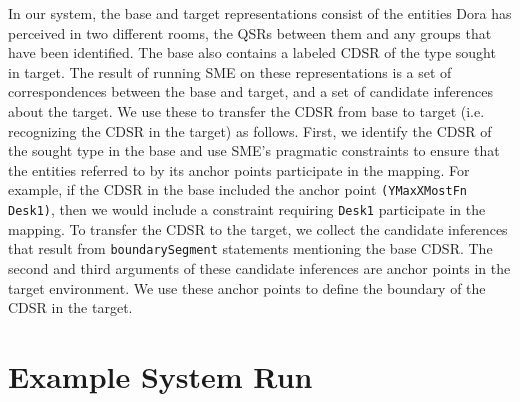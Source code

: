 \documentclass[letterpaper]{article}
\newcommand{\fw}[1]{\texttt{#1}}
\begin{document}

In our system, the base and target representations consist of the entities Dora has perceived in two different rooms, the QSRs between them and any groups that have been identified. The base also contains a labeled CDSR of the type sought in target. The result of running SME on these representations is a set of correspondences between the base and target, and a set of candidate inferences about the target. We use these to transfer the CDSR from base to target (i.e. recognizing the CDSR in the target) as follows. First, we identify the CDSR of the sought type in the base and use SME's pragmatic constraints to ensure that the entities referred to by its anchor points participate in the mapping. For example, if the CDSR in the base included the anchor point \fw{(YMaxXMostFn Desk1)}, then we would include a constraint requiring \fw{Desk1} participate in the mapping. To transfer the CDSR to the target, we collect the candidate inferences that result from \fw{boundarySegment} statements mentioning the base CDSR. The second and third arguments of these candidate inferences are anchor points in the target environment. We use these anchor points to define the boundary of the CDSR in the target.

\section{Example System Run}\label{sec:example}
\end{document}
